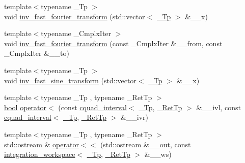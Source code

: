 \begin{DoxyCompactItemize}
\item 
{\footnotesize template$<$typename \+\_\+\+Tp $>$ }\\void \hyperlink{namespace____gnu__cxx_a1fe4b25c379855d94a657b688a327e80}{inv\+\_\+fast\+\_\+fourier\+\_\+transform} (std\+::vector$<$ \hyperlink{namespace____gnu__cxx_a3b19a9c800ca194374ef9172290f7d79}{\+\_\+\+Tp} $>$ \&\+\_\+\+\_\+x)
\item 
{\footnotesize template$<$typename \+\_\+\+Cmplx\+Iter $>$ }\\void \hyperlink{namespace____gnu__cxx_a98a4b1edde28198a694042bea78da893}{inv\+\_\+fast\+\_\+fourier\+\_\+transform} (const \+\_\+\+Cmplx\+Iter \&\+\_\+\+\_\+from, const \+\_\+\+Cmplx\+Iter \&\+\_\+\+\_\+to)
\item 
{\footnotesize template$<$typename \+\_\+\+Tp $>$ }\\void \hyperlink{namespace____gnu__cxx_a71c4de302fa0b6716f936d2d925352bd}{inv\+\_\+fast\+\_\+sine\+\_\+transform} (std\+::vector$<$ \hyperlink{namespace____gnu__cxx_a3b19a9c800ca194374ef9172290f7d79}{\+\_\+\+Tp} $>$ \&\+\_\+\+\_\+x)
\item 
{\footnotesize template$<$typename \+\_\+\+Tp , typename \+\_\+\+Ret\+Tp $>$ }\\\hyperlink{namespace____gnu__cxx_ae83aca57f97767d5d09188718728a0ac}{bool} \hyperlink{namespace____gnu__cxx_ac78e93e1aaf9f0948027570a303c7846}{operator$<$} (const \hyperlink{struct____gnu__cxx_1_1cquad__interval}{cquad\+\_\+interval}$<$ \hyperlink{namespace____gnu__cxx_a3b19a9c800ca194374ef9172290f7d79}{\+\_\+\+Tp}, \hyperlink{namespace____gnu__cxx_a886e03ece3d53ff7fa6c098a40f93fa5}{\+\_\+\+Ret\+Tp} $>$ \&\+\_\+\+\_\+ivl, const \hyperlink{struct____gnu__cxx_1_1cquad__interval}{cquad\+\_\+interval}$<$ \hyperlink{namespace____gnu__cxx_a3b19a9c800ca194374ef9172290f7d79}{\+\_\+\+Tp}, \hyperlink{namespace____gnu__cxx_a886e03ece3d53ff7fa6c098a40f93fa5}{\+\_\+\+Ret\+Tp} $>$ \&\+\_\+\+\_\+ivr)
\item 
{\footnotesize template$<$typename \+\_\+\+Tp , typename \+\_\+\+Ret\+Tp $>$ }\\std\+::ostream \& \hyperlink{namespace____gnu__cxx_a2f2af1d76b024a139e350aa0f81ac272}{operator$<$$<$} (std\+::ostream \&\+\_\+\+\_\+out, const \hyperlink{class____gnu__cxx_1_1integration__workspace}{integration\+\_\+workspace}$<$ \hyperlink{namespace____gnu__cxx_a3b19a9c800ca194374ef9172290f7d79}{\+\_\+\+Tp}, \hyperlink{namespace____gnu__cxx_a886e03ece3d53ff7fa6c098a40f93fa5}{\+\_\+\+Ret\+Tp} $>$ \&\+\_\+\+\_\+ws)
\item 

\end{DoxyCompactItemize}
